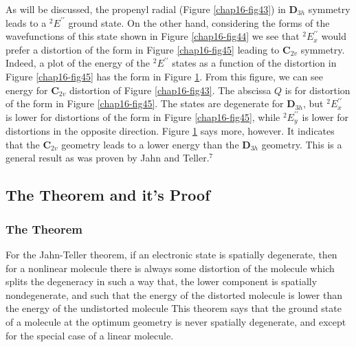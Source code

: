As will be discussed, the propenyl radial (Figure \ref{chap16-fig43})
in {\bf D}$_{3h}$ symmetry leads to a $^2E^{\prime\prime}$ ground
state.  On the other hand, considering the forms of the wavefunctions
of this state shown in Figure \ref{chap16-fig44} we see that
$^2E^{\prime\prime}_x$ would prefer a distortion of the form in Figure
\ref{chap16-fig45} leading to {\bf C}$_{2v}$ symmetry.  Indeed, a plot
of the energy of the $^2E^{\prime\prime}$ states as a function of the
distortion in Figure \ref{chap16-fig45} has the form in Figure
\ref{chap16-fig46}.  From this figure, we can see energy for {\bf
C}$_{2v}$ distortion of Figure \ref{chap16-fig43}. The abscissa $Q$ is
for distortion of the form in Figure \ref{chap16-fig45}.  The states
are degenerate for {\bf D}$_{3h}$, but $^2E^{\prime\prime}_x$ is lower
for distortions of the form in Figure \ref{chap16-fig45}, while
$^2E^{\prime\prime}_y$ is lower for distortions in the opposite
direction.  Figure \ref{chap16-fig46} says more, however.  It
indicates that the {\bf C}$_{2v}$ geometry leads to a lower energy
than the {\bf D}$_{3h}$ geometry.  This is a general result as was
proven by Jahn and Teller.$^7$

\begin{figure}
\caption{}
\label{chap16-fig46}
\end{figure}

\begin{figure}
\caption{}
\label{chap16-fig47}
\end{figure}

\subsection{The Theorem and it's Proof}

\subsubsection{The Theorem}

For the Jahn-Teller theorem, if an electronic state is spatially 
degenerate, then for a nonlinear molecule there is always some 
distortion of the molecule which splits the degeneracy in such a way 
that, the lower component is spatially nondegenerate, and such that 
the energy of the distorted molecule is lower than the energy of the 
undistorted molecule  This theorem says that the ground state of a 
molecule at the optimum geometry is never spatially degenerate, and 
except for the special case of a linear molecule.

